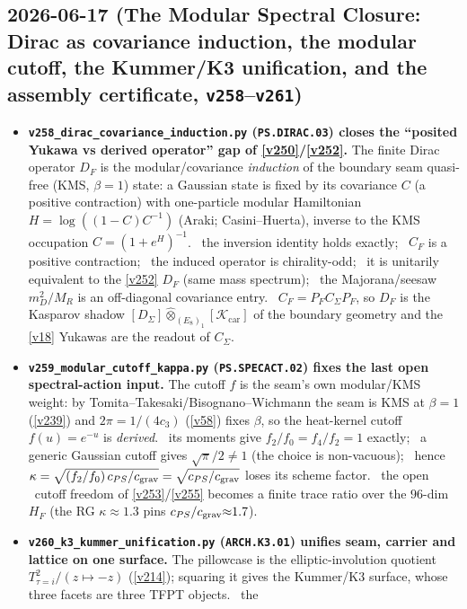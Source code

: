 \subsection*{2026-06-17 (The Modular Spectral Closure: Dirac as covariance induction, the modular cutoff, the Kummer/K3 unification, and the assembly certificate, \texttt{v258}--\texttt{v261})}
\begin{itemize}
\item \textbf{\texttt{v258\_dirac\_covariance\_induction.py} (\texttt{PS.DIRAC.03}) closes the
  ``posited Yukawa vs derived operator'' gap of \vref{v250}/\vref{v252}.} The finite Dirac operator $D_F$
  is the modular/covariance \emph{induction} of the boundary seam quasi-free (KMS, $\beta{=}1$) state: a
  Gaussian state is fixed by its covariance $C$ (a positive contraction) with one-particle modular
  Hamiltonian $H=\log((1{-}C)C^{-1})$ (Araki; Casini--Huerta), inverse to the KMS occupation
  $C=(1{+}e^{H})^{-1}$. \mE\ the inversion identity holds exactly; \mE\ $C_F$ is a positive contraction;
  \mE\ the induced operator is chirality-odd; \mE\ it is unitarily equivalent to the \vref{v252} $D_F$ (same
  mass spectrum); \mE\ the Majorana/seesaw $m_D^2/M_R$ is an off-diagonal covariance entry. \mC\
  $C_F=P_F C_\Sigma P_F$, so $D_F$ is the Kasparov shadow $[D_\Sigma]\widehat\otimes_{(E_8)_1}[\mathcal
  K_{\mathrm{car}}]$ of the boundary geometry and the \vref{v18} Yukawas are the readout of $C_\Sigma$.
\item \textbf{\texttt{v259\_modular\_cutoff\_kappa.py} (\texttt{PS.SPECACT.02}) fixes the last open
  spectral-action input.} The cutoff $f$ is the seam's own modular/KMS weight: by
  Tomita--Takesaki/Bisognano--Wichmann the seam is KMS at $\beta{=}1$ (\vref{v239}) and $2\pi{=}1/(4c_3)$
  (\vref{v58}) fixes $\beta$, so the heat-kernel cutoff $f(u)=e^{-u}$ is \emph{derived}. \mE\ its moments
  give $f_2/f_0=f_4/f_2=1$ exactly; \mE\ a generic Gaussian cutoff gives $\sqrt\pi/2\neq1$ (the choice is
  non-vacuous); \mE\ hence $\kappa=\sqrt{(f_2/f_0)\,c_{PS}/c_{\rm grav}}=\sqrt{c_{PS}/c_{\rm grav}}$ loses
  its scheme factor. \mC\ the open \mO\ cutoff freedom of \vref{v253}/\vref{v255} becomes a finite trace
  ratio over the $96$-dim $H_F$ (the RG $\kappa{\approx}1.3$ pins $c_{PS}/c_{\rm grav}{\approx}1.7$).
\item \textbf{\texttt{v260\_k3\_kummer\_unification.py} (\texttt{ARCH.K3.01}) unifies seam, carrier and
  lattice on one surface.} The pillowcase is the elliptic-involution quotient $T^2_{\tau=i}/(z{\mapsto}{-}z)$
  (\vref{v214}); squaring it gives the Kummer/K3 surface, whose three facets are three TFPT objects. \mE\ the

\end{itemize}
